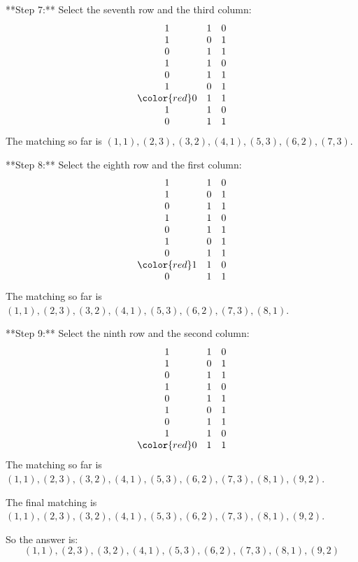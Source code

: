**Step 7:**
Select the seventh row and the third column:
\[
\begin{array}{ccc}
1 & 1 & 0 \\
1 & 0 & 1 \\
0 & 1 & 1 \\
1 & 1 & 0 \\
0 & 1 & 1 \\
1 & 0 & 1 \\
\color{red}0 & 1 & 1 \\
1 & 1 & 0 \\
0 & 1 & 1 \\
\end{array}
\]
The matching so far is \((1,1), (2,3), (3,2), (4,1), (5,3), (6,2), (7,3)\).

**Step 8:**
Select the eighth row and the first column:
\[
\begin{array}{ccc}
1 & 1 & 0 \\
1 & 0 & 1 \\
0 & 1 & 1 \\
1 & 1 & 0 \\
0 & 1 & 1 \\
1 & 0 & 1 \\
0 & 1 & 1 \\
\color{red}1 & 1 & 0 \\
0 & 1 & 1 \\
\end{array}
\]
The matching so far is \((1,1), (2,3), (3,2), (4,1), (5,3), (6,2), (7,3), (8,1)\).

**Step 9:**
Select the ninth row and the second column:
\[
\begin{array}{ccc}
1 & 1 & 0 \\
1 & 0 & 1 \\
0 & 1 & 1 \\
1 & 1 & 0 \\
0 & 1 & 1 \\
1 & 0 & 1 \\
0 & 1 & 1 \\
1 & 1 & 0 \\
\color{red}0 & 1 & 1 \\
\end{array}
\]
The matching so far is \((1,1), (2,3), (3,2), (4,1), (5,3), (6,2), (7,3), (8,1), (9,2)\).

The final matching is \((1,1), (2,3), (3,2), (4,1), (5,3), (6,2), (7,3), (8,1), (9,2)\).

So the answer is:
\[
\boxed{(1,1), (2,3), (3,2), (4,1), (5,3), (6,2), (7,3), (8,1), (9,2)}
\]